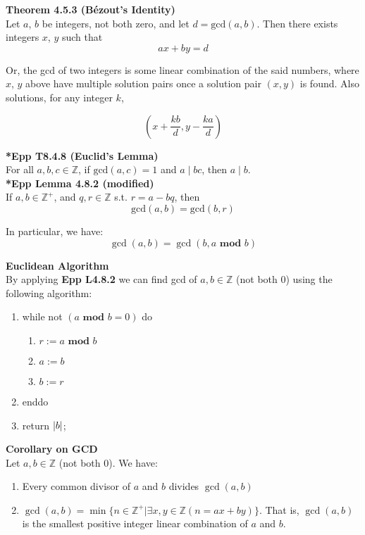 \documentclass[a4paper]{article}
\newcommand{\subheading}[1]{{\scriptsize\textbf{#1}}}
\begin{document}
\begin{multicols*}{4}
\subheading{Theorem 4.5.3 (B\'ezout's Identity)}\\
Let $a$, $b$ be integers, not both zero, and let $d = \mathrm{gcd}(a, b)$. Then
there exists integers $x$, $y$ such that $$ax + by = d$$

Or, the gcd of two integers is some linear combination of the said numbers,
where $x$, $y$ above have multiple solution pairs once a solution pair $(x, y)$
is found. Also solutions, for any integer $k$,

$$ (x+\frac{kb}{d}, y-\frac{ka}{d}) $$

\subheading{*Epp T8.4.8 (Euclid's Lemma)}\\
For all $a, b, c \in \mathbb{Z}$, if $\mathrm{gcd}(a, c) = 1$ and $a\;|\;bc$,
then $a\;|\;b$.\\

\subheading{*Epp Lemma 4.8.2 (modified)}\\
If $a, b \in \mathbb{Z}^+$, and $q, r \in \mathbb{Z}$ s.t. $r = a - bq$, then
$$\mathrm{gcd}(a, b)= \mathrm{gcd}(b, r)$$

In particular, we have:
$$\gcd(a, b) = \gcd(b, a \textbf{ mod } b)$$

\subheading{Euclidean Algorithm}\\
By applying \textbf{Epp L4.8.2} we can find gcd of $a, b \in \mathbb{Z}$ (not both 0) using the following algorithm:

\begin{enumerate} \itemsep -0.5em
	\item while not $(a \textbf{ mod } b = 0)$ do
	\begin{enumerate}[label=\theenumi.\arabic*] \itemsep -0.3em
		\item $r := a \textbf{ mod } b$
		\item $a := b$
		\item $b := r$
	\end{enumerate}
    \item enddo
    \item return $\abs{b}$;
\end{enumerate}

\subheading{Corollary on GCD}\\
Let $a, b \in \mathbb{Z}$ (not both 0). We have:

\begin{enumerate} \itemsep -0.5em
	\item Every common divisor of $a$ and $b$ divides $\gcd(a,b)$
	\item $\gcd(a,b) = \min\{n \in \mathbb{Z}^+ | \exists x,y\in\mathbb{Z} (n = ax + by)\}$. That is, $\gcd(a,b)$ is the smallest positive integer linear combination of $a$ and $b$.
\end{enumerate}


\end{multicols*}
\end{document}
